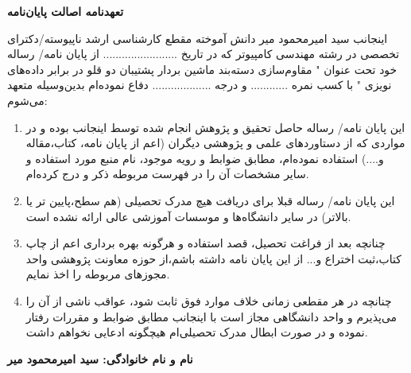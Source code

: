 \thispagestyle{empty}
\noindent

\textbf{\Large تعهدنامه اصالت  پایان‌نامه}
\vskip 1cm

اینجانب سید امیرمحمود میر دانش آموخته مقطع کارشناسی ارشد ناپیوسته/دکترای تخصصی در رشته مهندسی کامپیوتر که در تاریخ ........................ از پایان نامه/ رساله خود تحت عنوان " مقاوم‌سازی دسته‌بند ماشین بردار پشتیبان دو قلو در برابر داده‌های نویزی " با کسب نمره ............ و درجه ................... دفاع نموده‌ام بدین‌وسیله متعهد می‌شوم:
\begin{enumerate}
	\item این پایان نامه/ رساله حاصل تحقیق و پژوهش انجام شده توسط اینجانب بوده و در مواردی که از دستاوردهای علمی و پژوهشی دیگران (اعم از پایان نامه، کتاب،مقاله و....) استفاده نموده‌ام، مطابق ضوابط و رویه موجود، نام منبع مورد استفاده و سایر مشخصات آن را در فهرست مربوطه ذکر و درج کرده‌ام.
	\item این پایان نامه/ رساله قبلا برای دریافت هیچ مدرک تحصیلی (هم سطح،پایین تر یا بالاتر) در سایر دانشگاه‌ها و موسسات آموزشی عالی ارائه نشده است.
	\item 	چنانچه بعد از فراغت تحصیل، قصد استفاده و هرگونه بهره برداری اعم از چاپ کتاب،ثبت اختراع و... از این پایان نامه داشته باشم،از حوزه معاونت پژوهشی واحد مجوزهای مربوطه را اخذ نمایم.
	\item 	چنانچه در هر مقطعی زمانی خلاف موارد فوق ثابت شود، عواقب ناشی از آن را می‌پذیرم و واحد دانشگاهی مجاز است با اینجانب مطابق ضوابط و مقررات رفتار نموده و در صورت ابطال مدرک تحصیلی‌ام هیچگونه ادعایی نخواهم داشت.
\end{enumerate}

\vskip 0.5cm
\begin{flushleft}
\textbf{نام و نام خانوادگی: سید امیرمحمود میر}
\end{flushleft}